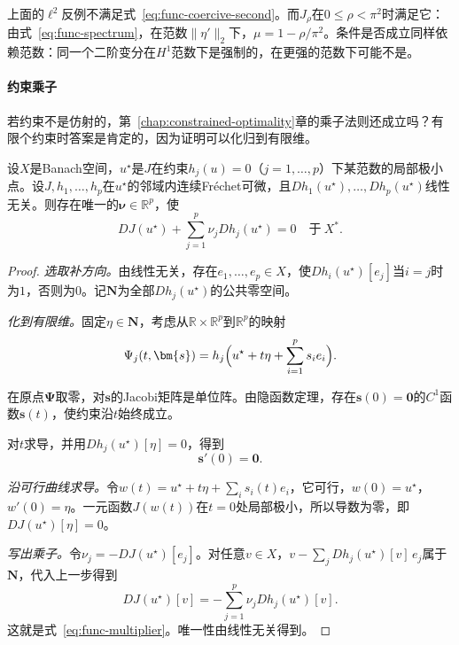 上面的$\ell^2$反例不满足式~\eqref{eq:func-coercive-second}。而$J_\rho$在$0\le\rho<\pi^2$时满足它：由式~\eqref{eq:func-spectrum}，在范数$\lVert\eta'\rVert_2$下，$\mu=1-\rho/\pi^2$。条件是否成立同样依赖范数：同一个二阶变分在$H^1$范数下是强制的，在更强的范数下可能不是。

\paragraph{约束乘子}
若约束不是仿射的，第~\ref{chap:constrained-optimality}章的乘子法则还成立吗？有限个约束时答案是肯定的，因为证明可以化归到有限维。

\begin{theorem}[有限个等式约束的乘子法则]
\label{thm:func-multiplier}
设$X$是Banach空间，$u^\star$是$J$在约束$h_j(u)=0$（$j=1,\ldots,p$）下某范数的局部极小点。设$J,h_1,\ldots,h_p$在$u^\star$的邻域内连续Fréchet可微，且$Dh_1(u^\star),\ldots,Dh_p(u^\star)$线性无关。则存在唯一的$\bm{\nu}\in\mathbb{R}^p$，使
\begin{equation}
 DJ(u^\star)+\sum_{j=1}^p\nu_jDh_j(u^\star)=0\quad\text{于}\ X^*.
 \label{eq:func-multiplier}
\end{equation}
\end{theorem}

\begin{proof}
\emph{选取补方向。}由线性无关，存在$e_1,\ldots,e_p\in X$，使$Dh_i(u^\star)[e_j]$当$i=j$时为$1$，否则为$0$。记$\bm{N}$为全部$Dh_j(u^\star)$的公共零空间。

\emph{化到有限维。}固定$\eta\in\bm{N}$，考虑从$\mathbb{R}\times\mathbb{R}^p$到$\mathbb{R}^p$的映射
\[
 \Psi_j(t,\bm{s})=h_j\Bigl(u^\star+t\eta+\sum_{i=1}^ps_ie_i\Bigr).
\]

在原点$\bm{\Psi}$取零，对$\bm{s}$的Jacobi矩阵是单位阵。由隐函数定理，存在$\bm{s}(0)=\bm{0}$的$C^1$函数$\bm{s}(t)$，使约束沿$t$始终成立。

对$t$求导，并用$Dh_j(u^\star)[\eta]=0$，得到
\[
 \bm{s}'(0)=\bm{0}.
\]

\emph{沿可行曲线求导。}令$w(t)=u^\star+t\eta+\sum_is_i(t)e_i$，它可行，$w(0)=u^\star$，$w'(0)=\eta$。一元函数$J(w(t))$在$t=0$处局部极小，所以导数为零，即$DJ(u^\star)[\eta]=0$。

\emph{写出乘子。}令$\nu_j=-DJ(u^\star)[e_j]$。对任意$v\in X$，$v-\sum_jDh_j(u^\star)[v]\,e_j$属于$\bm{N}$，代入上一步得到
\[
 DJ(u^\star)[v]=-\sum_{j=1}^p\nu_jDh_j(u^\star)[v].
\]
这就是式~\eqref{eq:func-multiplier}。唯一性由线性无关得到。
\end{proof}

